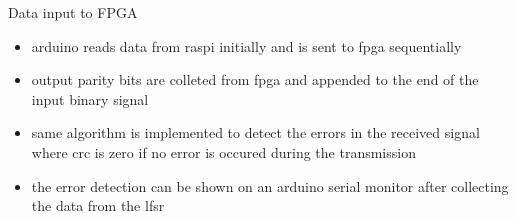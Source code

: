 \documentclass{beamer}
\begin{document}
\begin{frame}{Data input to FPGA}

\begin{itemize}
    \item arduino reads data from raspi initially and is sent to fpga sequentially
    \item output parity bits are colleted from fpga and appended to the end of the input binary signal
    \item same algorithm is implemented to detect the errors in the received signal where crc is zero if no error is occured during the transmission
    \item the error detection can be shown on an arduino serial monitor after collecting the data from the lfsr
\end{itemize}

\end{frame}
\end{document}
